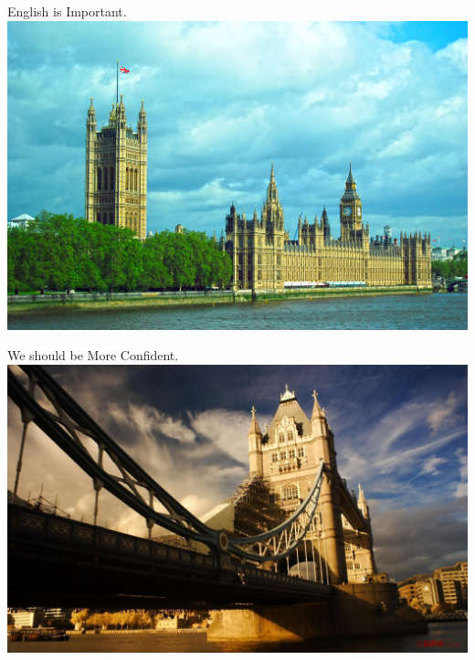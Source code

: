 \documentclass[10pt]{beamer}
\begin{document}
\begin{frame}{English is Important.}
    \centering
    \includegraphics[width=\textwidth, height = 0.9\textheight]{Figures/BigBen.jpg}
\end{frame}

\begin{frame}{We should be More Confident.}
    \centering
    \includegraphics[width=\textwidth, height = 0.9\textheight]{Figures/TowerBridge.jpg}
\end{frame}
\end{document}
